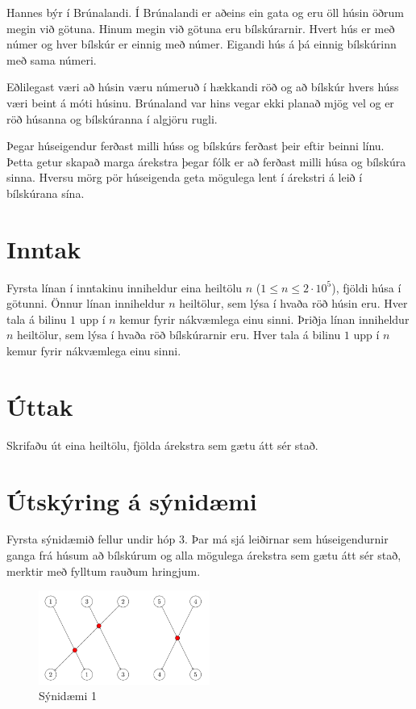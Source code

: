 
Hannes býr í Brúnalandi.
Í Brúnalandi er aðeins ein gata og eru öll húsin öðrum megin við götuna.
Hinum megin við götuna eru bílskúrarnir.
Hvert hús er með númer og hver bílskúr er einnig með númer.
Eigandi hús á þá einnig bílskúrinn með sama númeri.

Eðlilegast væri að húsin væru númeruð í hækkandi röð 
og að bílskúr hvers húss væri beint á móti húsinu.
Brúnaland var hins vegar ekki planað mjög vel og er röð húsanna og bílskúranna í algjöru rugli.

Þegar húseigendur ferðast milli húss og bílskúrs ferðast þeir eftir beinni línu.
Þetta getur skapað marga árekstra þegar fólk er að ferðast milli húsa og bílskúra sinna.
Hversu mörg pör húseigenda geta mögulega lent í árekstri á leið í bílskúrana sína.


\section*{Inntak}
Fyrsta línan í inntakinu inniheldur eina heiltölu $n$ ($1 \leq n \leq
2\cdot10^5$), fjöldi húsa í götunni.
Önnur línan inniheldur $n$ heiltölur, sem lýsa í hvaða röð húsin eru. Hver tala á bilinu $1$ upp í $n$ kemur fyrir nákvæmlega einu sinni.
Þriðja línan inniheldur $n$ heiltölur, sem lýsa í hvaða röð bílskúrarnir eru. Hver tala á bilinu $1$ upp í $n$ kemur fyrir nákvæmlega einu sinni.

\section*{Úttak}
Skrifaðu út eina heiltölu, fjölda árekstra sem gætu átt sér stað.

\section*{Útskýring á sýnidæmi}
Fyrsta sýnidæmið fellur undir hóp 3. Þar má sjá leiðirnar sem húseigendurnir ganga frá húsum
að bílskúrum og alla mögulega árekstra sem gætu átt sér stað, merktir með fylltum rauðum hringjum.
\begin{figure}[h!]
  \centering
    \includegraphics[width=0.5\textwidth]{sample_illustration}
  \caption{Sýnidæmi 1}
\end{figure}

